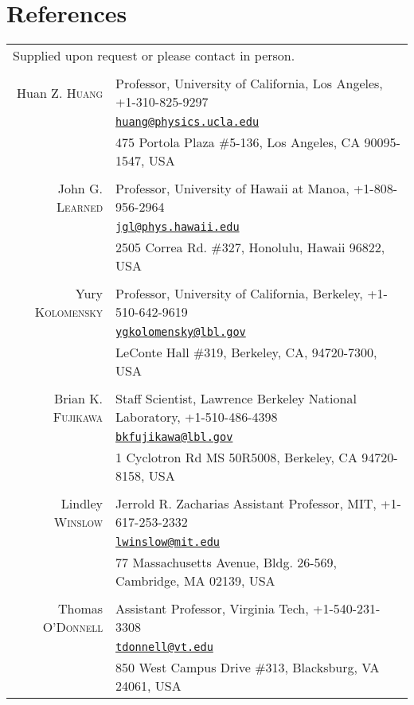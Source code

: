 \documentclass[10pt]{article} %
\begin{document}

\section{References}

\noindent\begin{tabular}{rp{12cm}}
\multicolumn{2}{l}{\footnotesize{Supplied upon request or please contact in
	person.}}\\
\multicolumn{2}{c}{}\\

Huan Z. \textsc{Huang} & Professor, University of California, Los Angeles, +1-310-825-9297\\
& \href{mailto:huang@physics.ucla.edu}{\nolinkurl{huang@physics.ucla.edu}}\\
& 475 Portola Plaza \#5-136, Los Angeles, CA 90095-1547, USA\\
\\
John G. \textsc{Learned} & Professor, University of Hawaii at Manoa, +1-808-956-2964\\
& \href{mailto:jgl@phys.hawaii.edu}{\nolinkurl{jgl@phys.hawaii.edu}}\\
& 2505 Correa Rd. \#327, Honolulu, Hawaii 96822, USA\\
\\
Yury \textsc{Kolomensky} & Professor, University of California, Berkeley, +1-510-642-9619\\
& \href{mailto:ygkolomensky@lbl.gov}{\nolinkurl{ygkolomensky@lbl.gov}}\\
& LeConte Hall \#319, Berkeley, CA, 94720-7300, USA\\
\\
Brian K. \textsc{Fujikawa} & Staff Scientist, Lawrence Berkeley National Laboratory, +1-510-486-4398\\
& \href{mailto:bkfujikawa@lbl.gov}{\nolinkurl{bkfujikawa@lbl.gov}}\\
& 1 Cyclotron Rd MS 50R5008, Berkeley, CA 94720-8158, USA\\
\\
Lindley \textsc{Winslow} & Jerrold R. Zacharias Assistant Professor, MIT, +1-617-253-2332\\
& \href{mailto:lwinslow@mit.edu}{\nolinkurl{lwinslow@mit.edu}}\\ 
& 77 Massachusetts Avenue, Bldg. 26-569, Cambridge, MA 02139, USA\\
\\
Thomas \textsc{O'Donnell} & Assistant Professor, Virginia Tech, +1-540-231-3308\\
& \href{mailto:tdonnell@vt.edu}{\nolinkurl{tdonnell@vt.edu}}\\
& 850 West Campus Drive \#313, Blacksburg, VA 24061, USA\\


\end{tabular}
\end{document}
